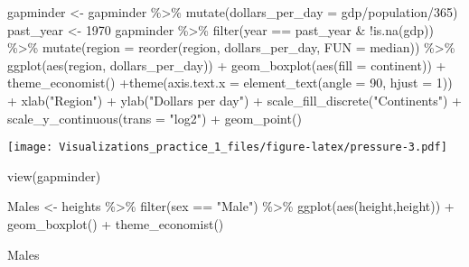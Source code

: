 \documentclass[
]{article}
\newenvironment{Shaded}{\begin{snugshade}}{\end{snugshade}}
\newcommand{\AttributeTok}[1]{\textcolor[rgb]{0.77,0.63,0.00}{#1}}
\newcommand{\DecValTok}[1]{\textcolor[rgb]{0.00,0.00,0.81}{#1}}
\newcommand{\FunctionTok}[1]{\textcolor[rgb]{0.00,0.00,0.00}{#1}}
\newcommand{\NormalTok}[1]{#1}
\newcommand{\OtherTok}[1]{\textcolor[rgb]{0.56,0.35,0.01}{#1}}
\newcommand{\SpecialCharTok}[1]{\textcolor[rgb]{0.00,0.00,0.00}{#1}}
\newcommand{\StringTok}[1]{\textcolor[rgb]{0.31,0.60,0.02}{#1}}
\begin{document}
\begin{Shaded}
\begin{Highlighting}[]
\NormalTok{gapminder }\OtherTok{\textless{}{-}}\NormalTok{ gapminder }\SpecialCharTok{\%\textgreater{}\%}
  \FunctionTok{mutate}\NormalTok{(}\AttributeTok{dollars\_per\_day =}\NormalTok{ gdp}\SpecialCharTok{/}\NormalTok{population}\SpecialCharTok{/}\DecValTok{365}\NormalTok{)}
\NormalTok{past\_year }\OtherTok{\textless{}{-}} \DecValTok{1970}
\NormalTok{gapminder }\SpecialCharTok{\%\textgreater{}\%}
  \FunctionTok{filter}\NormalTok{(year }\SpecialCharTok{==}\NormalTok{ past\_year }\SpecialCharTok{\&} \SpecialCharTok{!}\FunctionTok{is.na}\NormalTok{(gdp)) }\SpecialCharTok{\%\textgreater{}\%} 
  \FunctionTok{mutate}\NormalTok{(}\AttributeTok{region =} \FunctionTok{reorder}\NormalTok{(region, dollars\_per\_day, }\AttributeTok{FUN =}\NormalTok{ median)) }\SpecialCharTok{\%\textgreater{}\%}
  \FunctionTok{ggplot}\NormalTok{(}\FunctionTok{aes}\NormalTok{(region, dollars\_per\_day)) }\SpecialCharTok{+} \FunctionTok{geom\_boxplot}\NormalTok{(}\FunctionTok{aes}\NormalTok{(}\AttributeTok{fill =}\NormalTok{ continent)) }\SpecialCharTok{+}
  \FunctionTok{theme\_economist}\NormalTok{() }\SpecialCharTok{+}\FunctionTok{theme}\NormalTok{(}\AttributeTok{axis.text.x =} \FunctionTok{element\_text}\NormalTok{(}\AttributeTok{angle =} \DecValTok{90}\NormalTok{, }\AttributeTok{hjust =} \DecValTok{1}\NormalTok{)) }\SpecialCharTok{+}
  \FunctionTok{xlab}\NormalTok{(}\StringTok{"Region"}\NormalTok{) }\SpecialCharTok{+} \FunctionTok{ylab}\NormalTok{(}\StringTok{"Dollars per day"}\NormalTok{) }\SpecialCharTok{+} \FunctionTok{scale\_fill\_discrete}\NormalTok{(}\StringTok{"Continents"}\NormalTok{) }\SpecialCharTok{+}
  \FunctionTok{scale\_y\_continuous}\NormalTok{(}\AttributeTok{trans =} \StringTok{"log2"}\NormalTok{) }\SpecialCharTok{+} \FunctionTok{geom\_point}\NormalTok{()}
\end{Highlighting}
\end{Shaded}

\texttt{[image: Visualizations\_practice\_1\_files/figure-latex/pressure-3.pdf]}

\begin{Shaded}
\begin{Highlighting}[]
\FunctionTok{view}\NormalTok{(gapminder)}




\NormalTok{Males }\OtherTok{\textless{}{-}} 
\NormalTok{  heights }\SpecialCharTok{\%\textgreater{}\%} 
  \FunctionTok{filter}\NormalTok{(sex }\SpecialCharTok{==} \StringTok{"Male"}\NormalTok{) }\SpecialCharTok{\%\textgreater{}\%} \FunctionTok{ggplot}\NormalTok{(}\FunctionTok{aes}\NormalTok{(height,height)) }\SpecialCharTok{+} 
  \FunctionTok{geom\_boxplot}\NormalTok{() }\SpecialCharTok{+} \FunctionTok{theme\_economist}\NormalTok{() }

\NormalTok{Males}
\end{Highlighting}
\end{Shaded}
\end{document}

